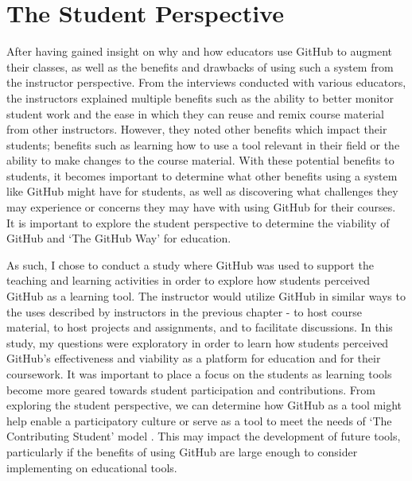 








\chapter{The Student Perspective}

After having gained insight on why and how educators use GitHub to augment their classes, as well as the benefits and drawbacks of using such a system from the instructor perspective. From the interviews conducted with various educators, the instructors explained multiple benefits such as the ability to better monitor student work and the ease in which they can reuse and remix course material from other instructors. However, they noted other benefits which impact their students; benefits such as learning how to use a tool relevant in their field or the ability to make changes to the course material. With these potential benefits to students, it becomes important to determine what other benefits using a system like GitHub might have for students, as well as discovering what challenges they may experience or concerns they may have with using GitHub for their courses. It is important to explore the student perspective to determine the viability of GitHub and `The GitHub Way' for education.

As such, I chose to conduct a study where GitHub was used to support the teaching and learning activities in order to explore how students perceived GitHub as a learning tool. The instructor would utilize GitHub in similar ways to the uses described by instructors in the previous chapter - to host course material, to host projects and assignments, and to facilitate discussions. In this study, my questions were exploratory in order to learn how students perceived GitHub's effectiveness and viability as a platform for education and for their coursework. It was important to place a focus on the students as learning tools become more geared towards student participation and contributions. From exploring the student perspective, we can determine how GitHub as a tool might help enable a participatory culture \cite{jenkins2009confronting} or serve as a tool to meet the needs of `The Contributing Student' model \cite{hamer2008contributing}. This may impact the development of future tools, particularly if the benefits of using GitHub are large enough to consider implementing on educational tools.

